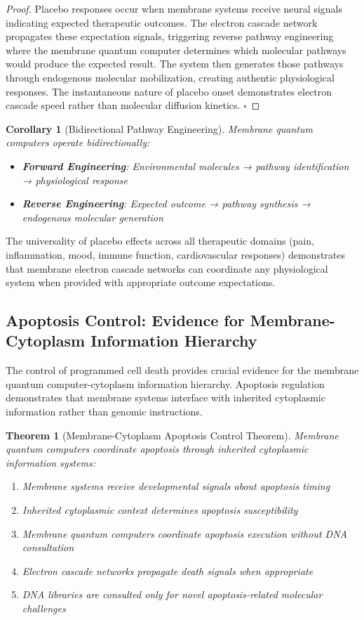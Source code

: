 \documentclass[12pt,a4paper]{article}
\newtheorem{theorem}{Theorem}
\newtheorem{corollary}{Corollary}
\begin{document}
\begin{proof}
Placebo responses occur when membrane systems receive neural signals indicating expected therapeutic outcomes. The electron cascade network propagates these expectation signals, triggering reverse pathway engineering where the membrane quantum computer determines which molecular pathways would produce the expected result. The system then generates those pathways through endogenous molecular mobilization, creating authentic physiological responses. The instantaneous nature of placebo onset demonstrates electron cascade speed rather than molecular diffusion kinetics. $\square$
\end{proof}

\begin{corollary}[Bidirectional Pathway Engineering]
Membrane quantum computers operate bidirectionally:
\begin{itemize}
\item \textbf{Forward Engineering}: Environmental molecules → pathway identification → physiological response
\item \textbf{Reverse Engineering}: Expected outcome → pathway synthesis → endogenous molecular generation
\end{itemize}
\end{corollary}

The universality of placebo effects across all therapeutic domains (pain, inflammation, mood, immune function, cardiovascular responses) demonstrates that membrane electron cascade networks can coordinate any physiological system when provided with appropriate outcome expectations.

\subsection{Apoptosis Control: Evidence for Membrane-Cytoplasm Information Hierarchy}

The control of programmed cell death provides crucial evidence for the membrane quantum computer-cytoplasm information hierarchy. Apoptosis regulation demonstrates that membrane systems interface with inherited cytoplasmic information rather than genomic instructions.

\begin{theorem}[Membrane-Cytoplasm Apoptosis Control Theorem]
Membrane quantum computers coordinate apoptosis through inherited cytoplasmic information systems:
\begin{enumerate}
\item Membrane systems receive developmental signals about apoptosis timing
\item Inherited cytoplasmic context determines apoptosis susceptibility
\item Membrane quantum computers coordinate apoptosis execution without DNA consultation
\item Electron cascade networks propagate death signals when appropriate
\item DNA libraries are consulted only for novel apoptosis-related molecular challenges
\end{enumerate}
\end{theorem}
\end{document}
